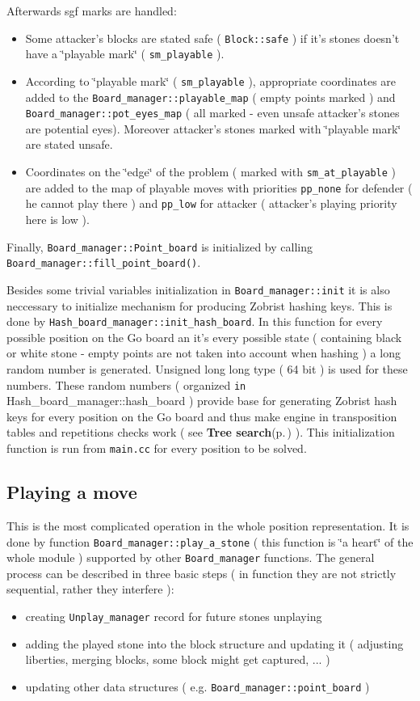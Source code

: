 Afterwards sgf marks are handled:\begin{itemize}
\item Some attacker's blocks are stated safe ( {\tt Block::safe} ) if it's stones doesn't have a \char`\"{}playable mark\char`\"{} ( {\tt sm\_\-playable} ).\item According to \char`\"{}playable mark\char`\"{} ( {\tt sm\_\-playable} ), appropriate coordinates are added to the {\tt Board\_\-manager::playable\_\-map} ( empty points marked ) and {\tt Board\_\-manager::pot\_\-eyes\_\-map} ( all marked - even unsafe attacker's stones are potential eyes). Moreover attacker's stones marked with \char`\"{}playable mark\char`\"{} are stated unsafe.\item Coordinates on the \char`\"{}edge\char`\"{} of the problem ( marked with {\tt sm\_\-at\_\-playable} ) are added to the map of playable moves with priorities {\tt pp\_\-none} for defender ( he cannot play there ) and {\tt pp\_\-low} for attacker ( attacker's playing priority here is low ).\end{itemize}


Finally, {\tt Board\_\-manager::Point\_\-board} is initialized by calling {\tt Board\_\-manager::fill\_\-point\_\-board()}.

Besides some trivial variables initialization in {\tt Board\_\-manager::init} it is also neccessary to initialize mechanism for producing Zobrist hashing keys. This is done by {\tt Hash\_\-board\_\-manager::init\_\-hash\_\-board}. In this function for every possible position on the Go board an it's every possible state ( containing black or white stone - empty points are not taken into account when hashing ) a long random number is generated. Unsigned long long type ( 64 bit ) is used for these numbers. These random numbers ( organized {\tt in} Hash\_\-board\_\-manager::hash\_\-board ) provide base for generating Zobrist hash keys for every position on the Go board and thus make engine in transposition tables and repetitions checks work ( see {\bf Tree search}{\rm (p.\,\pageref{page_3})} ). This initialization function is run from {\tt main.cc} for every position to be solved.\subsection{Playing a move}\label{page_6_page_6__sec_3}
This is the most complicated operation in the whole position representation. It is done by function {\tt Board\_\-manager::play\_\-a\_\-stone} ( this function is \char`\"{}a heart\char`\"{} of the whole module ) supported by other {\tt Board\_\-manager} functions. The general process can be described in three basic steps ( in function they are not strictly sequential, rather they interfere ):\begin{itemize}
\item creating {\tt Unplay\_\-manager} record for future stones unplaying\item adding the played stone into the block structure and updating it ( adjusting liberties, merging blocks, some block might get captured, ... )\item updating other data structures ( e.g. {\tt Board\_\-manager::point\_\-board} )\end{itemize}


